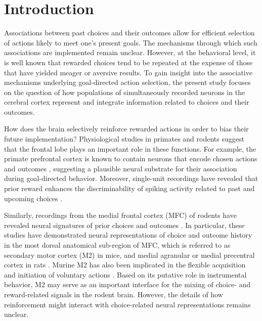\section{Introduction}

Associations between past choices and their outcomes allow for efficient selection of actions likely to meet one’s present goals. The mechanisms through which such associations are implemented remain unclear. However, at the behavioral level, it is well known that rewarded choices tend to be repeated at the expense of those that have yielded meager or aversive results. To gain insight into the associative mechanisms underlying goal-directed action selection, the present study focuses on the question of how populations of simultaneously recorded neurons in the cerebral cortex represent and integrate information related to choices and their outcomes.

How does the brain selectively reinforce rewarded actions in order to bias their future implementation? Physiological studies in primates and rodents suggest that the frontal lobe plays an important role in these functions. For example, the primate prefrontal cortex is known to contain neurons that encode chosen actions and outcomes \citep{barraclough2004prefrontal,  genovesio2006representation, seo2007dynamic, histed2009learning}, suggesting a plausible neural substrate for their association during goal-directed behavior. Moreover, single-unit recordings have revealed that prior reward enhances the discriminability of spiking activity related to past \citep{donahue2013cortical} and upcoming choices \citep{histed2009learning}.

Similarly, recordings from the medial frontal cortex (MFC) of rodents have revealed neural signatures of prior choices and outcomes \citep{sul2010distinct, sul2011role, hyman2017novel}. In particular, these studies have demonstrated neural representations of choice and outcome history in the most dorsal anatomical sub-region of MFC, which is referred to as secondary motor cortex (M2) in mice, and medial agranular or medial precentral cortex in rats \citep{sesack1989topographical, barthas2017secondary}. Murine M2 has also been implicated in the flexible acquisition and initiation of voluntary actions \citep{ostlund2009evidence, gremel2013premotor, murakami2014neural, siniscalchi2016fast, barthas2017secondary, makino2017transformation}. Based on its putative role in instrumental behavior, M2 may serve as an important interface for the mixing of choice- and reward-related signals in the rodent brain. However, the details of how reinforcement might interact with choice-related neural representations remains unclear. 

